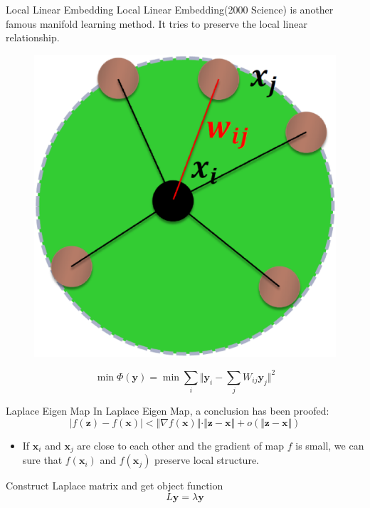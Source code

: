 \documentclass{beamer}
\newcommand{\bol}[1]{\textbf{#1}}
\begin{document}
\begin{darkframes}
    \begin{frame}{Local Linear Embedding}
    \alert{Local Linear Embedding}(2000 Science) is another famous manifold learning method. It tries to preserve the local linear relationship.
    \begin{figure}
    \centering
    \includegraphics[scale=0.15]{./figs/fig8.eps}
    \end{figure}
	\begin{displaymath}
	\min\Phi(\bol{y}) = \min\sum_i\Vert \bol{y}_i - \sum_jW_{ij}\bol{y}_j  \Vert^2
	\end{displaymath}
    \end{frame}
    
    \begin{frame}{Laplace Eigen Map}
    In Laplace Eigen Map, a conclusion has been proofed: \\
    \begin{displaymath}
    	\vert f(\bol{z} ) - f(\bol{x})\vert < \Vert \nabla f(\bol{x}) \Vert\cdot \Vert \bol{z} - \bol{x} \Vert + o(\Vert \bol{z} - \bol{x} \Vert)
    \end{displaymath}
    \begin{itemize}
    \item If $\bol{x}_i$ and $\bol{x}_j$ are close to each other and the gradient of map $f$ is small, we can sure that $f(\bol{x}_i)$ and $f(\bol{x}_j)$ preserve local structure.
    \end{itemize}
    Construct Laplace matrix and get object function
    \begin{displaymath}
    	L\bol{y} = \lambda\bol{y}
    \end{displaymath}
    \end{frame}
    

\end{darkframes}
\end{document}
